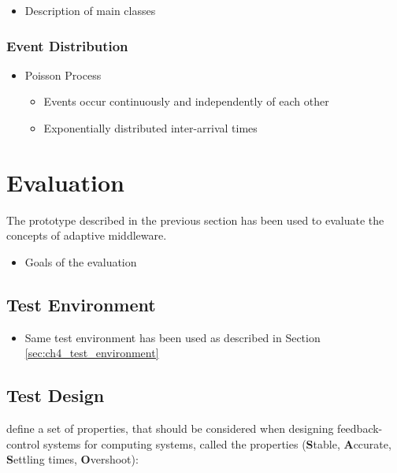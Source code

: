 \begin{itemize}
	\item Description of main classes
\end{itemize}

\subsubsection{Event Distribution}

\begin{itemize}
	\item Poisson Process
	\begin{itemize}
		\item Events occur continuously and independently of each other
		\item Exponentially distributed inter-arrival times
	\end{itemize}
\end{itemize}

\section{Evaluation}
\label{sec:ch05_evaluation}

The prototype described in the previous section has been used to evaluate the concepts of adaptive middleware. 

\begin{itemize}
	\item Goals of the evaluation
\end{itemize}

\subsection{Test Environment}

\begin{itemize}
	\item Same test environment has been used as described in Section \ref{sec:ch4_test_environment}
\end{itemize}

\subsection{Test Design}

\cite{Abdelzaher:2008ub} define a set of properties, that should be considered when designing feedback-control systems for computing systems, called the  properties (\textbf{S}table, \textbf{A}ccurate, \textbf{S}ettling times, \textbf{O}vershoot):

